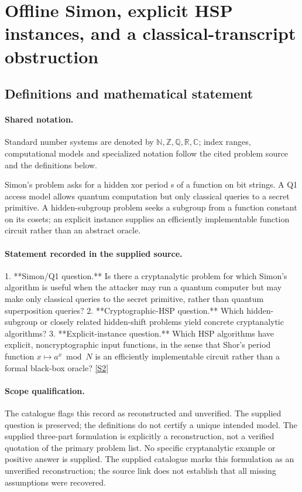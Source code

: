 \documentclass[11pt]{article}
\newcommand{\sref}[2]{\hyperlink{source:#1:#2}{[S#2]}}
\begin{document}
\section{Offline Simon, explicit HSP instances, and a classical-transcript obstruction}\label{statement}

\subsection{Definitions and mathematical statement}

\paragraph{Shared notation.}Standard number systems are denoted by $\mathbb N,\mathbb Z,\mathbb Q,\mathbb R,\mathbb C$; index ranges, computational models and specialized notation follow the cited problem source and the definitions below.


Simon's problem asks for a hidden xor period s of a function on bit strings. A Q1 access model allows quantum computation but only classical queries to a secret primitive. A hidden-subgroup problem seeks a subgroup from a function constant on its cosets; an explicit instance supplies an efficiently implementable function circuit rather than an abstract oracle.
\paragraph{Statement recorded in the supplied source.}
1. **Simon/Q1 question.** Is there a cryptanalytic problem for which Simon's algorithm is useful when the attacker may run a quantum computer but may make only classical queries to the secret primitive, rather than quantum superposition queries?
2. **Cryptographic-HSP question.** Which hidden-subgroup or closely related hidden-shift problems yield concrete cryptanalytic algorithms?
3. **Explicit-instance question.** Which HSP algorithms have explicit, noncryptographic input functions, in the sense that Shor's period function \(x\mapsto a^x\bmod N\) is an efficiently implementable circuit rather than a formal black-box oracle? \sref{statement}{2}
\paragraph{Scope qualification.}
The catalogue flags this record as reconstructed and unverified. The supplied question is preserved; the definitions do not certify a unique intended model. The supplied three-part formulation is explicitly a reconstruction, not a verified quotation of the primary problem list. No specific cryptanalytic example or positive answer is supplied.
The supplied catalogue marks this formulation as an unverified reconstruction; the source link does not establish that all missing assumptions were recovered.
\end{document}
